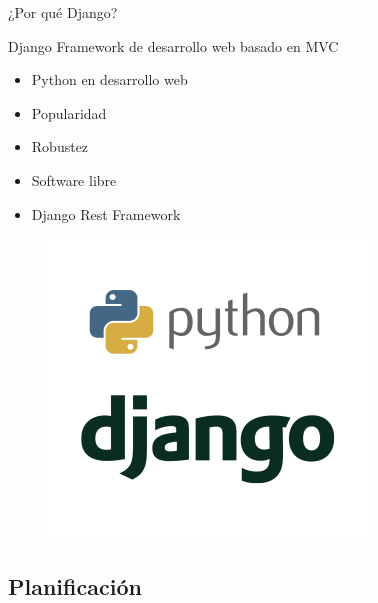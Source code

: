 \documentclass[10pt,xcolor=svgnames]{beamer}
\begin{document}
\begin{frame}{¿Por qué Django?}  
  \begin{block}{Django}
    Framework de desarrollo web basado en MVC
  \end{block}
  
  \begin{minipage}[t]{.6\textwidth}
    \vspace*{0.5cm}
    \begin{itemize}
    \item Python en desarrollo web
    \item Popularidad
    \item Robustez
    \item Software libre
    \item Django Rest Framework
    \end{itemize}
  \end{minipage}%
  \begin{minipage}[t]{.4\textwidth}    
    \begin{figure}[H]
      \centering
      \includegraphics[width=\textwidth]{./img/python-y-django}
    \end{figure}
  \end{minipage}
\end{frame}


\subsection{Planificación}
\end{document}
